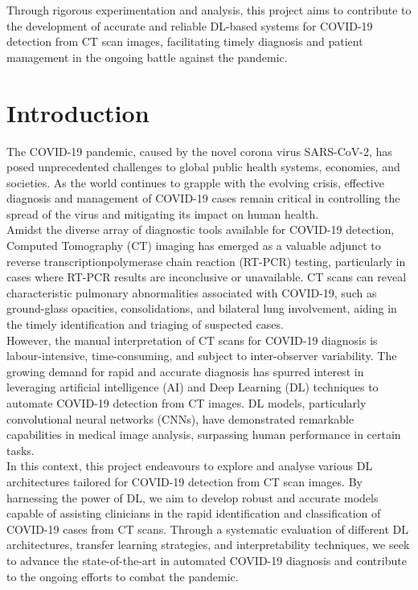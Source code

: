 \documentclass[12pt, a4paper]{report}
\begin{document}
Through rigorous experimentation and analysis, this project aims to contribute to the development of accurate and reliable DL-based systems for COVID-19 detection from CT scan images, facilitating timely diagnosis and patient management in the ongoing battle against the pandemic.


\newpage

\tableofcontents

\newpage

\listoffigures

\newpage

\chapter{Introduction}

The COVID-19 pandemic, caused by the novel corona virus SARS-CoV-2, has posed
unprecedented challenges to global public health systems, economies, and societies. As the world continues to grapple with the evolving crisis, effective diagnosis and management of COVID-19 cases remain critical in controlling the spread of the virus and mitigating its
impact on human health.\\

Amidst the diverse array of diagnostic tools available for COVID-19 detection, Computed Tomography (CT) imaging has emerged as a valuable adjunct to reverse transcriptionpolymerase chain reaction (RT-PCR) testing, particularly in cases where RT-PCR results are inconclusive or unavailable. CT scans can reveal characteristic pulmonary abnormalities associated with COVID-19, such as ground-glass opacities, consolidations, and bilateral lung involvement, aiding in the timely identification and triaging of suspected cases.\\

However, the manual interpretation of CT scans for COVID-19 diagnosis is labour-intensive, time-consuming, and subject to inter-observer variability. The growing demand for rapid and accurate diagnosis has spurred interest in leveraging artificial intelligence (AI) and Deep Learning (DL) techniques to automate COVID-19 detection from CT images. DL models, particularly convolutional neural networks (CNNs), have demonstrated remarkable capabilities in medical image analysis, surpassing human performance in certain tasks.\\

In this context, this project endeavours to explore and analyse various DL architectures tailored for COVID-19 detection from CT scan images. By harnessing the power of DL, we aim to develop robust and accurate models capable of assisting clinicians in the rapid identification and classification of COVID-19 cases from CT scans. Through a systematic evaluation of different DL architectures, transfer learning strategies, and interpretability techniques, we seek to advance the state-of-the-art in automated COVID-19 diagnosis and contribute to the ongoing efforts to combat the pandemic.
\end{document}

